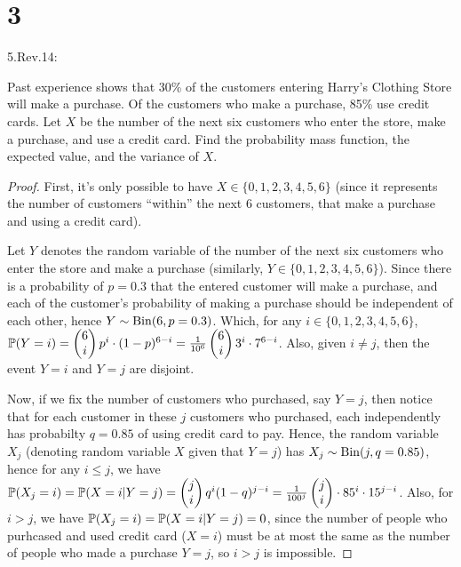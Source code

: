 \documentclass{article}
\begin{document}
\newpage
\section*{3}
\begin{ques}\label{q3}
    5.Rev.14:
    
    Past experience shows that 30\% of the customers entering Harry's Clothing Store will make a purchase. Of the customers who make a purchase, 85\% use credit cards. Let $X$ be the number of the next six customers who enter the store, make a purchase, and use a credit card. Find the probability mass function, the expected value, and the variance of $X$.
\end{ques}

\begin{proof}
    First, it's only possible to have $X\in\{0,1,2,3,4,5,6\}$ (since it represents the number of customers ``within'' the next $6$ customers, that make a purchase and using a credit card). 
    
    Let $Y$ denotes the random variable of the number of the next six customers who enter the store and make a purchase (similarly, $Y\in\{0,1,2,3,4,5,6\}$). Since there is a probability of $p=0.3$ that the entered customer will make a purchase, and each of the customer's probability of making a purchase should be independent of each other, hence $Y\sim \mathrm{Bin}(6, p=0.3)$. Which, for any $i\in\{0,1,2,3,4,5,6\}$, $\mathbb{P}(Y=i) = \begin{pmatrix}6\\i\end{pmatrix}p^i \cdot (1-p)^{6-i} = \frac{1}{10^6}\begin{pmatrix}6\\i\end{pmatrix}3^i \cdot 7^{6-i}$. Also, given $i\neq j$, then the event ${Y=i}$ and ${Y=j}$ are disjoint.

    \hfil

    Now, if we fix the number of customers who purchased, say $Y=j$, then notice that for each customer in these $j$ customers who purchased, each independently has probabilty $q=0.85$ of using credit card to pay. Hence, the random variable $X_j$ (denoting random variable $X$ given that $Y=j$) has $X_j \sim \mathrm{Bin}(j, q=0.85)$, hence for any $i\leq j$, we have $\mathbb{P}(X_j = i) = \mathbb{P}(X=i|Y=j) = \begin{pmatrix}j\\i\end{pmatrix}q^i (1-q)^{j-i} = \frac{1}{100^j}\begin{pmatrix}j\\i\end{pmatrix}\cdot 85^i \cdot 15^{j-i}$. Also, for $i>j$, we have $\mathbb{P}(X_j=i) = \mathbb{P}(X=i|Y=j)=0$, since the number of people who purhcased and used credit card ($X=i$) must be at most the same as the number of people who made a purchase $Y=j$, so $i>j$ is impossible.


\end{proof}
\end{document}
